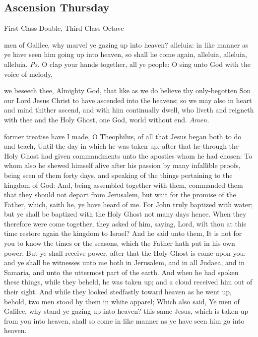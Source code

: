 \clearpage
\subsection{Ascension Thursday}
\begin{inhead}
    {First Class Double, Third Class Octave}
\end{inhead}


\introit
{} men of Galilee, why marvel ye gazing up into heaven? alleluia: in like manner as ye have seen him going up into heaven, so shall he come again, alleluia, alleluia, alleluia. \textit{Ps.} O clap your hands together, all ye people: O sing unto God with the voice of melody,

\collect\label{AscensionCollect}
 we beseech thee, Almighty God, that like as we do believe thy only-begotten Son our Lord Jesus Christ to have ascended into the heavens; so we may also in heart and mind thither ascend, and with him continually dwell, who liveth and reigneth with thee and the Holy Ghost, one God, world without end. \textit{Amen.}

 former treatise have I made, O Theophilus, of all that Jesus began both to do and teach, Until the day in which he was taken up, after that he through the Holy Ghost had given commandments unto the apostles whom he had chosen: To whom also he shewed himself alive after his passion by many infallible proofs, being seen of them forty days, and speaking of the things pertaining to the kingdom of God: And, being assembled together with them, commanded them that they should not depart from Jerusalem, but wait for the promise of the Father, which, saith he, ye have heard of me. For John truly baptized with water; but ye shall be baptized with the Holy Ghost not many days hence. When they therefore were come together, they asked of him, saying, Lord, wilt thou at this time restore again the kingdom to Israel? And he said unto them, It is not for you to know the times or the seasons, which the Father hath put in his own power. But ye shall receive power, after that the Holy Ghost is come upon you: and ye shall be witnesses unto me both in Jerusalem, and in all Judaea, and in Samaria, and unto the uttermost part of the earth. And when he had spoken these things, while they beheld, he was taken up; and a cloud received him out of their sight. And while they looked stedfastly toward heaven as he went up, behold, two men stood by them in white apparel; Which also said, Ye men of Galilee, why stand ye gazing up into heaven? this same Jesus, which is taken up from you into heaven, shall so come in like manner as ye have seen him go into heaven.

